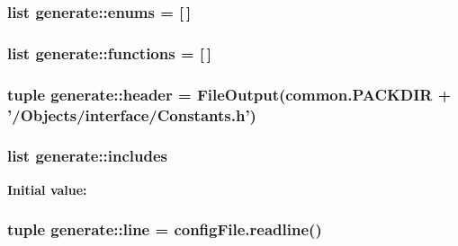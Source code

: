 \label{namespacegenerate_ae15cb71cab91bceae5e3c231b1ef2288}
\hypertarget{namespacegenerate_a9d156f337a7e184da3766c544f6c0903}{
\subsubsection[{enums}]{\setlength{\rightskip}{0pt plus 5cm}list {\bf generate::enums} = \mbox{[}$\,$\mbox{]}}}
\label{namespacegenerate_a9d156f337a7e184da3766c544f6c0903}
\hypertarget{namespacegenerate_a05d9c77e59a8af4e394485410e7142af}{
\subsubsection[{functions}]{\setlength{\rightskip}{0pt plus 5cm}list {\bf generate::functions} = \mbox{[}$\,$\mbox{]}}}
\label{namespacegenerate_a05d9c77e59a8af4e394485410e7142af}
\hypertarget{namespacegenerate_a84be2876be8c5ad91d79a09a00459850}{
\subsubsection[{header}]{\setlength{\rightskip}{0pt plus 5cm}tuple {\bf generate::header} = FileOutput(common.PACKDIR + '/Objects/interface/Constants.h')}}
\label{namespacegenerate_a84be2876be8c5ad91d79a09a00459850}
\hypertarget{namespacegenerate_ae24c825a39fcd7e77ebe88a9b9c3d2e2}{
\subsubsection[{includes}]{\setlength{\rightskip}{0pt plus 5cm}list {\bf generate::includes}}}
\label{namespacegenerate_ae24c825a39fcd7e77ebe88a9b9c3d2e2}
{\bfseries Initial value:}
\begin{DoxyCode}
\end{DoxyCode}
\hypertarget{namespacegenerate_ac750e14543c2bb425f55a27c6f8f648b}{
\subsubsection[{line}]{\setlength{\rightskip}{0pt plus 5cm}tuple {\bf generate::line} = configFile.readline()}}
